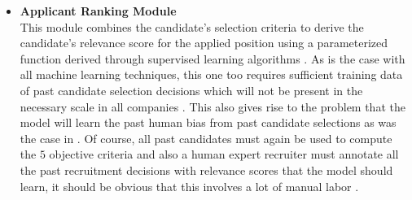 \documentclass[draft,final]{thesisclass} %
\begin{document}
\begin{itemize}
    \item \textbf{Applicant Ranking Module}\\
    This module combines the candidate's selection criteria to derive the candidate's relevance score for the applied position using a parameterized function derived through supervised learning algorithms \parencite[518]{applicant_semantic_matching}.
    As is the case with all machine learning techniques, this one too requires sufficient training data of past candidate selection decisions which will not be present in the necessary scale in all companies \parencite[523]{applicant_semantic_matching}.
    This also gives rise to the problem that the model will learn the past human bias from past candidate selections as was the case in \textcite[9]{bias_ai_hiring}.
    Of course, all past candidates must again be used to compute the $5$ objective criteria and also a human expert recruiter must annotate all the past recruitment decisions with relevance scores that the model should learn, it should be obvious that this involves a lot of manual labor \parencite[523-524]{applicant_semantic_matching}.
\end{itemize}
\end{document}
